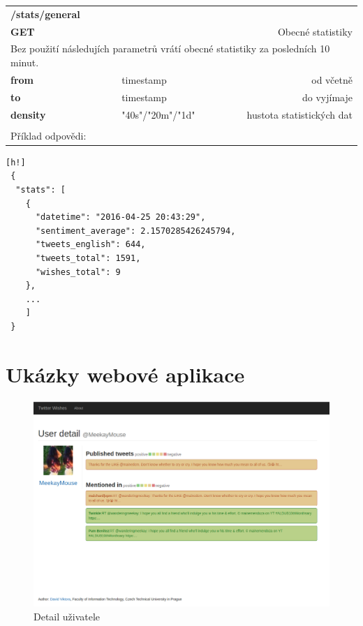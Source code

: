 \documentclass[thesis=B,czech]{FITthesis}[2012/06/26]
\begin{document}
\begin{table}[h]
\begin{tabular}{llllr}
\rowcolor[HTML]{EFEFEF}
\large \textbf{/stats/general}        &         &                 &        & \multicolumn{1}{l}{}                \\
\rowcolor[HTML]{EFEFEF}
\textbf{GET}          &         &                 &        & Obecné statistiky                        \\
\multicolumn{5}{l}{\parbox[t]{12.8cm}{Bez použití následujích parametrů vrátí obecné statistiky za posledních 10 minut.  }  } \\
\textbf{from}         &         & timestamp       &        & od včetně                           \\
\textbf{to}           &         & timestamp       &        & do vyjímaje                         \\
\textbf{density}        &         & "40s"/"20m"/"1d"         &        & hustota statistických dat   \\
 & & & & \\
 Příklad odpovědi:   \\
\end{tabular}
\end{table}

\begin{lstlisting}[nolol=true][h!]
 {
  "stats": [
    {
      "datetime": "2016-04-25 20:43:29",
      "sentiment_average": 2.1570285426245794,
      "tweets_english": 644,
      "tweets_total": 1591,
      "wishes_total": 9
    },
    ...
    ]
 }
\end{lstlisting}

\chapter{Ukázky webové aplikace}
\label{appendix-web}
	\begin{figure}[ht]
    	\centering
    	\includegraphics[width=1\textwidth]{images/web-user.png}
    	\caption{Detail uživatele}
    	\label{fig:web-userdetail}
	\end{figure}
\end{document}

